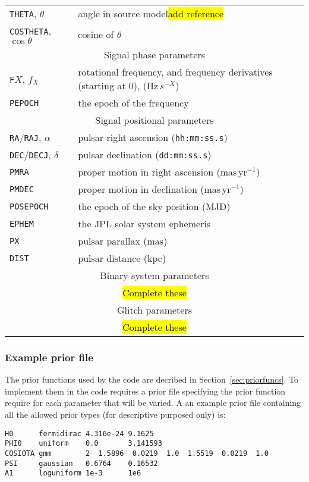 \begin{longtable}{l|l}
{\tt THETA}, $\theta$ & angle in source model\hl{add reference} \\
{\tt COSTHETA}, $\cos{\theta}$ & cosine of $\theta$ \\
\hline
\multicolumn{2}{c}{Signal phase parameters} \\
\hline
{\tt F}$X$, $f_X$ & rotational frequency, and frequency derivatives (starting at 0), (Hz$\,s^{-X}$) \\
{\tt PEPOCH} & the epoch of the frequency \\
\hline
\multicolumn{2}{c}{Signal positional parameters} \\
\hline
{\tt RA}/{\tt RAJ}, $\alpha$ & pulsar right ascension ({\tt hh:mm:ss.s}) \\
{\tt DEC}/{\tt DECJ}, $\delta$ & pulsar declination ({\tt dd:mm:ss.s}) \\
{\tt PMRA} & proper motion in right ascension (mas\,yr$^{-1}$) \\
{\tt PMDEC} & proper motion in declination (mas\,yr$^{-1}$) \\
{\tt POSEPOCH} & the epoch of the sky position (MJD) \\
{\tt EPHEM} & the JPL solar system ephemeris \\
{\tt PX} & pulsar parallax (mas) \\
{\tt DIST} & pulsar distance (kpc) \\
\hline
\multicolumn{2}{c}{Binary system parameters} \\
\hline
\multicolumn{2}{c}{\hl{Complete these}} \\
\hline
\multicolumn{2}{c}{Glitch parameters} \\
\hline
\multicolumn{2}{c}{\hl{Complete these}} \\
\end{longtable}


\subsubsection{Example prior file}

The prior functions used by the code are decribed in Section~\ref{sec:priorfuncs}. To implement them in the code requires a prior
file specifying the prior function require for each parameter that will be varied. A an example prior file containing all the
allowed prior types (for descriptive purposed only) is:
\begin{verbatim}
H0      fermidirac 4.316e-24 9.1625
PHI0    uniform    0.0       3.141593
COSIOTA gmm        2  1.5896  0.0219  1.0  1.5519  0.0219  1.0
PSI     gaussian   0.6764    0.16532
A1      loguniform 1e-3      1e6
\end{verbatim}

